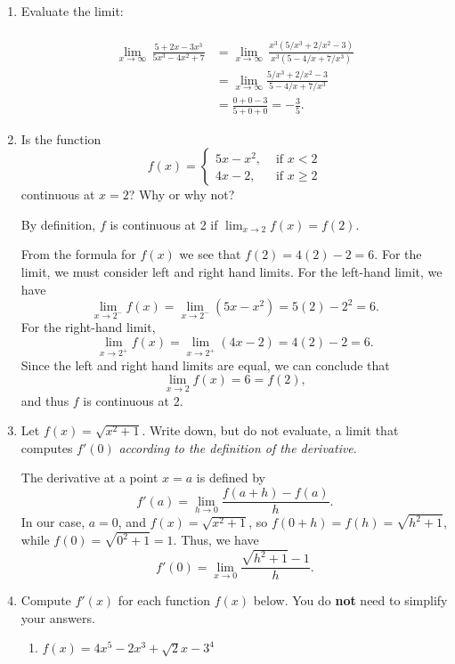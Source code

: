 \documentclass[12pt]{article}
\newcommand{\points}[1]{\marginpar{\hspace{24pt}[#1]}}
\newcommand{\di}{\displaystyle}
\begin{document}
 \begin{enumerate}
 \item  Evaluate the limit: \points{3}\\
 \\
\begin{align*}  \lim_{x\to \infty}\,\frac{5+2x-3x^3}{5x^3-4x^2+7}&= \lim_{x\to\infty}\,\frac{x^3(5/x^3+2/x^2-3)}{x^3(5-4/x+7/x^3)}\\
& =\lim_{x\to \infty}\frac{5/x^3+2/x^2-3}{5-4/x+7/x^3}\\
& = \frac{0+0-3}{5+0+0} = -\frac{3}{5}.
\end{align*}
 
 \bigskip
 
 \item Is the function \points{3}
 \[
 f(x) = \begin{cases} 5x-x^2, & \text{ if } x<2\\ 4x-2, & \text{ if } x\geq 2\end{cases}
 \]
 continuous at $x=2$? Why or why not? 
 
\bigskip

By definition, $f$ is continuous at 2 if $\di \lim_{x\to 2}f(x) = f(2)$.

From the formula for $f(x)$ we see that $f(2) =4(2)-2=6$. For the limit, we must consider left and right hand limits. For the left-hand limit, we have
\[
\lim_{x\to 2^-}f(x) = \lim_{x\to 2^-}(5x-x^2) = 5(2)-2^2 = 6.
\]
For the right-hand limit,
\[
\lim_{x\to 2^+}f(x) = \lim_{x\to 2^+}(4x-2) = 4(2)-2 = 6.
\]
Since the left and right hand limits are equal, we can conclude that
\[
\lim_{x\to 2}f(x) = 6 = f(2),
\]
and thus $f$ is continuous at 2.

\bigskip
 
 \item Let $f(x) = \sqrt{x^2+1}$. Write down, but do not evaluate, a limit that computes $f'(0)$ \textit{according to the definition of the derivative}. \points{2}
 
\bigskip

The derivative at a point $x=a$ is defined by 
\[
f'(a) = \lim_{h\to 0}\frac{f(a+h)-f(a)}{h}.
\]
In our case, $a=0$, and $f(x) = \sqrt{x^2+1}$, so $f(0+h) = f(h) = \sqrt{h^2+1}$, while $f(0) = \sqrt{0^2+1}=1$. Thus, we have
\[
f'(0) = \lim_{x\to 0}\frac{\sqrt{h^2+1}-1}{h}.
\]

\item Compute $f'(x)$ for each function $f(x)$ below. You do \textbf{not} need to simplify your answers.
\begin{enumerate}
\item $f(x) = 4x^5-2x^3+\sqrt{2}x-3^4$\points{2}


\end{enumerate}
\end{enumerate}
\end{document}
